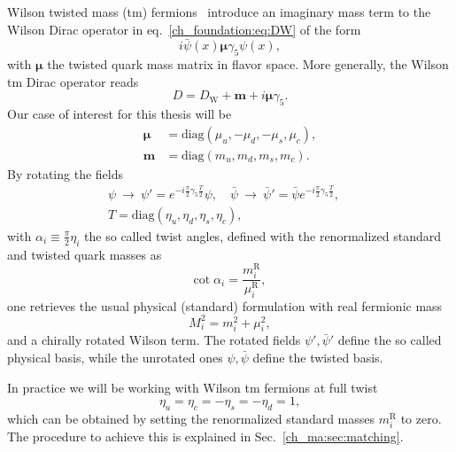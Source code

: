 Wilson twisted mass (tm) fermions~\citep{Frezzotti:1999vv,Frezzotti:2000nk,Frezzotti:2001ea,Frezzotti:2003ni,Shindler:2007vp} introduce an imaginary mass term to the Wilson Dirac operator in eq.~\eqref{ch_foundation:eq:DW} of the form
\begin{equation}
i\bar{\psi}(x)\boldsymbol{\mu}\gamma_5\psi(x),
\end{equation}
with $\boldsymbol{\mu}$ the twisted quark mass matrix in flavor space. More generally, the Wilson tm Dirac operator reads
\begin{equation}
D=D_{\textrm{W}}+\boldsymbol{m}+i\boldsymbol{\mu}\gamma_5.
\end{equation}
Our case of interest for this thesis will be
\begin{align}
\boldsymbol{\mu}&={\textrm{diag}}\left(\mu_u,-\mu_d,-\mu_s,\mu_c\right), \\
\boldsymbol{m}&={\textrm{diag}}\left(m_u,m_d,m_s,m_c\right).
\end{align}
By rotating the fields
\begin{gather}
\label{ch_foundation:eq:chiral_rot}
\psi~\to~\psi' = e^{-i\frac{\pi}{2}\gamma_5 \frac{T}{2}}\psi, \quad
\bar{\psi}~\to~\bar{\psi}' = \bar{\psi} e^{-i\frac{\pi}{2}\gamma_5 \frac{T}{2}}, \quad \\
T = {\textrm{diag}}(\eta_u,\eta_d,\eta_s,\eta_c),
\end{gather}
with $\alpha_i\equiv\frac{\pi}{2}\eta_i$ the so called twist angles, defined with the renormalized standard and twisted quark masses as
\begin{equation}
{\textrm{cot}}\;\alpha_i=\frac{m_i^{\textrm{R}}}{\mu_i^{\textrm{R}}},
\end{equation}
one retrieves the usual physical (standard) formulation with real fermionic mass
\begin{equation}
M_i^2=m_i^2+\mu_i^2,
\end{equation}
and a chirally rotated Wilson term. The rotated fields $\psi',\bar{\psi}'$ define the so called physical basis, while the unrotated ones $\psi,\bar{\psi}$ define the twisted basis.

In practice we will be working with Wilson tm fermions at full twist
\begin{equation}
\label{ch_foundation:eq:mte}
\eta_u=\eta_c=-\eta_s=-\eta_d=1,
\end{equation}
which can be obtained by setting the renormalized standard masses $m_i^{\textrm{R}}$ to zero. The procedure to achieve this is explained in Sec.~\ref{ch_ma:sec:matching}.

